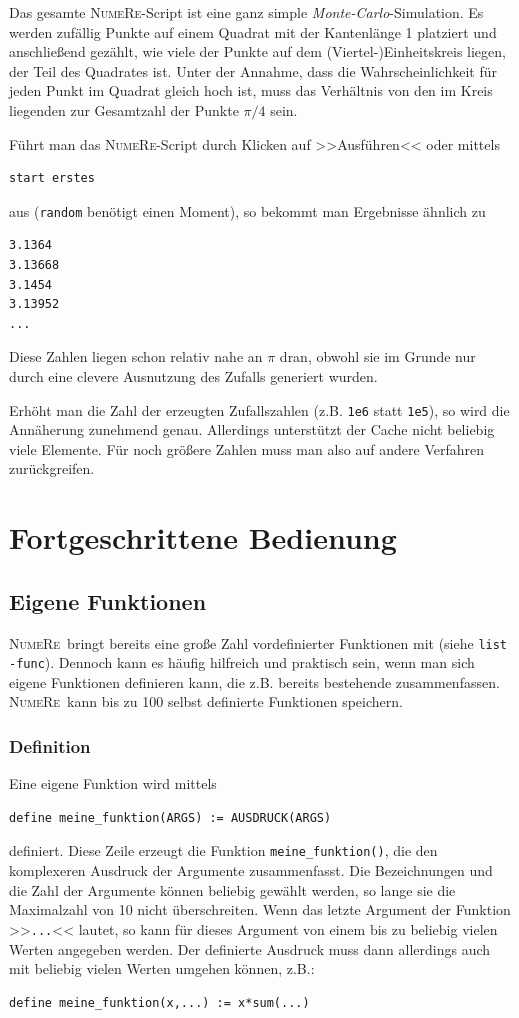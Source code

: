 \documentclass[DIV=14,headsepline,footsepline]{scrbook}
\newcommand{\NR}{\textsc{Nu\-me\-Re}}
\begin{document}
				Das gesamte \NR-Script ist eine ganz simple \emph{Monte-Carlo}-Simulation. Es werden zufällig Punkte auf einem Quadrat mit der Kantenlänge 1 platziert und anschließend gezählt, wie viele der Punkte auf dem (Viertel-)Einheitskreis liegen, der Teil des Quadrates ist. Unter der Annahme, dass die Wahrscheinlichkeit für jeden Punkt im Quadrat gleich hoch ist, muss das Verhältnis von den im Kreis liegenden zur Gesamtzahl der Punkte $\pi/4$ sein.
				
				Führt man das \NR-Script durch Klicken auf >>Ausführen<< oder mittels
				\begin{lstlisting}
start erstes
				\end{lstlisting}
				aus (\verb+random+ benötigt einen Moment), so bekommt man Ergebnisse ähnlich zu
				\begin{lstlisting}
3.1364
3.13668
3.1454
3.13952
...
				\end{lstlisting}
				Diese Zahlen liegen schon relativ nahe an $\pi$ dran, obwohl sie im Grunde nur durch eine clevere Ausnutzung des Zufalls generiert wurden.
				
				Erhöht man die Zahl der erzeugten Zufallszahlen (z.B. \verb+1e6+ statt \verb+1e5+), so wird die Annäherung zunehmend genau. Allerdings unterstützt der Cache nicht beliebig viele Elemente. Für noch größere Zahlen muss man also auf andere Verfahren zurückgreifen.
	\part{Fortgeschrittene Bedienung}
		\chapter{Eigene Funktionen}
			\NR\ bringt bereits eine große Zahl vordefinierter Funktionen mit (siehe \verb+list -func+). Dennoch kann es häufig hilfreich und praktisch sein, wenn man sich eigene Funktionen definieren kann, die z.B. bereits bestehende zusammenfassen. \NR\ kann bis zu 100 selbst definierte Funktionen speichern.
			\section{Definition}
				Eine eigene Funktion wird mittels
				\begin{lstlisting}
define meine_funktion(ARGS) := AUSDRUCK(ARGS)
				\end{lstlisting}
				definiert. Diese Zeile erzeugt die Funktion \verb+meine_funktion()+, die den komplexeren Ausdruck der Argumente zusammenfasst. Die Bezeichnungen und die Zahl der Argumente können beliebig gewählt werden, so lange sie die Maximalzahl von 10 nicht überschreiten. Wenn das letzte Argument der Funktion >>\verb+...+<< lautet, so kann für dieses Argument von einem bis zu beliebig vielen Werten angegeben werden. Der definierte Ausdruck muss dann allerdings auch mit beliebig vielen Werten umgehen können, z.B.:
				\begin{lstlisting}
define meine_funktion(x,...) := x*sum(...)
				\end{lstlisting}
				
\end{document}
